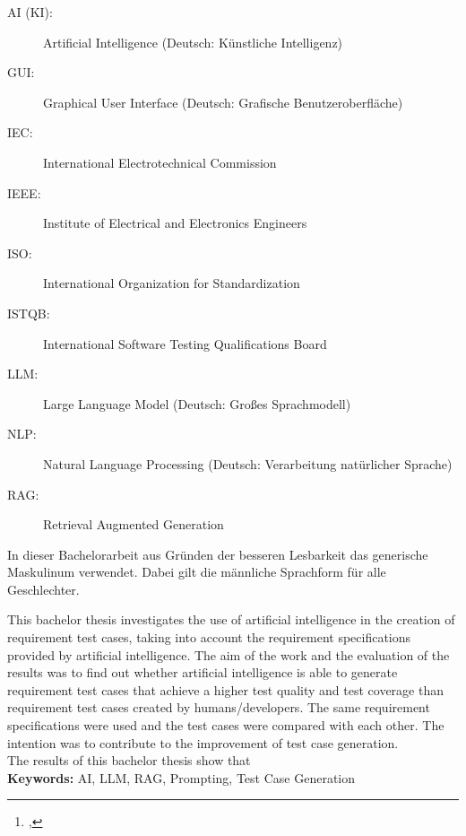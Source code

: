 \documentclass[12pt,toc=bib,toc=listof]{scrreprt}
\title{\reprttopic}
\author{\reprtstudentname\footnote{\reprtstudentid, \reprtstudentmail}}
\begin{document}
\maketitle
{}

\tableofcontents

\label{sec:abkuerzungsverzeichnis}

\begin{description}
  \item[AI (KI):] Artificial Intelligence (Deutsch: Künstliche Intelligenz)
  \item[GUI:] Graphical User Interface (Deutsch: Grafische Benutzeroberfläche)
  \item[IEC:] International Electrotechnical Commission
  \item[IEEE:] Institute of Electrical and Electronics Engineers
  \item[ISO:] International Organization for Standardization
  \item[ISTQB:] International Software Testing Qualifications Board
  \item[LLM:] Large Language Model (Deutsch: Großes Sprachmodell)
  \item[NLP:] Natural Language Processing (Deutsch: Verarbeitung natürlicher Sprache)
  \item[RAG:] Retrieval Augmented Generation
\end{description}

\newpage
\listoffigures
\newpage
{} %
\label{sec:genderHinweis}
In dieser Bachelorarbeit aus Gründen der besseren Lesbarkeit das generische Maskulinum verwendet. Dabei gilt die männliche Sprachform für alle Geschlechter.

\label{sec:abstract}
This bachelor thesis investigates the use of artificial intelligence in the creation of requirement test cases, taking into account the requirement specifications provided by artificial intelligence. The aim of the work and the evaluation of the results was to find out whether artificial intelligence is able to generate requirement test cases that achieve a higher test quality and test coverage than requirement test cases created by humans/developers. The same requirement specifications were used and the test cases were compared with each other. The intention was to contribute to the improvement of test case generation.\\
The results of this bachelor thesis show that
\\
\textbf{Keywords:} AI, LLM, RAG, Prompting, Test Case Generation
\newpage
\end{document}
